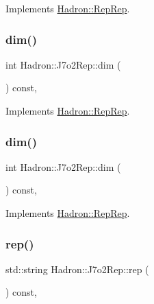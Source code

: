 Implements \mbox{\hyperlink{structHadron_1_1RepRep_a92c8802e5ed7afd7da43ccfd5b7cd92b}{Hadron\+::\+Rep\+Rep}}.

\mbox{\label{structHadron_1_1J7o2Rep_a0134ed51bb5cad59f0a552c5bc472765}} 
\subsubsection{\texorpdfstring{dim()}{dim()}\hspace{0.1cm}{\footnotesize\ttfamily [2/3]}}
{\footnotesize\ttfamily int Hadron\+::\+J7o2\+Rep\+::dim (\begin{DoxyParamCaption}{ }\end{DoxyParamCaption}) const\hspace{0.3cm}{\ttfamily [inline]}, {\ttfamily [virtual]}}



Implements \mbox{\hyperlink{structHadron_1_1RepRep_a92c8802e5ed7afd7da43ccfd5b7cd92b}{Hadron\+::\+Rep\+Rep}}.

\mbox{\label{structHadron_1_1J7o2Rep_a0134ed51bb5cad59f0a552c5bc472765}} 
\subsubsection{\texorpdfstring{dim()}{dim()}\hspace{0.1cm}{\footnotesize\ttfamily [3/3]}}
{\footnotesize\ttfamily int Hadron\+::\+J7o2\+Rep\+::dim (\begin{DoxyParamCaption}{ }\end{DoxyParamCaption}) const\hspace{0.3cm}{\ttfamily [inline]}, {\ttfamily [virtual]}}



Implements \mbox{\hyperlink{structHadron_1_1RepRep_a92c8802e5ed7afd7da43ccfd5b7cd92b}{Hadron\+::\+Rep\+Rep}}.

\mbox{\label{structHadron_1_1J7o2Rep_a7fe87890d8fa36768f1a09f929f26b9c}} 
\subsubsection{\texorpdfstring{rep()}{rep()}\hspace{0.1cm}{\footnotesize\ttfamily [1/3]}}
{\footnotesize\ttfamily std\+::string Hadron\+::\+J7o2\+Rep\+::rep (\begin{DoxyParamCaption}{ }\end{DoxyParamCaption}) const\hspace{0.3cm}{\ttfamily [inline]}, {\ttfamily [virtual]}}



